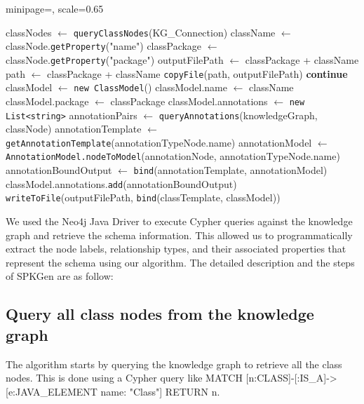 \documentclass[runningheads]{llncs}
\begin{document}
\begin{algorithm}
\caption{SPKGen Algorithm}
\begin{adjustbox}{minipage=\textwidth, scale=0.65}
\begin{algorithmic}[1]
    \State classNodes $\gets$ \texttt{queryClassNodes}(KG\_Connection)
        \State className $\gets$ classNode.\texttt{getProperty}("name")
        \State classPackage $\gets$ classNode.\texttt{getProperty}("package")
        \State outputFilePath $\gets$ classPackage + className
        \State path $\gets$ classPackage + className
            \State \texttt{copyFile}(path, outputFilePath)
        \Else
            \State \textbf{continue}
        \EndIf
        \State classModel $\gets$ \texttt{new ClassModel}()
        \State classModel.name $\gets$ className
        \State classModel.package $\gets$ classPackage
        \State classModel.annotations $\gets$ \texttt{new List<string>}
        \State annotationPairs $\gets$ \texttt{queryAnnotations}(knowledgeGraph, classNode)
            \State annotationTemplate $\gets$ \texttt{getAnnotationTemplate}(annotationTypeNode.name)
            \State annotationModel $\gets$ \texttt{AnnotationModel.nodeToModel}(annotationNode, annotationTypeNode.name)
            \State annotationBoundOutput $\gets$ \texttt{bind}(annotationTemplate, annotationModel)
            \State classModel.annotations.\texttt{add}(annotationBoundOutput)
            \State \texttt{writeToFile}(outputFilePath, \texttt{bind}(classTemplate, classModel))
        \EndFor
    \EndFor
\EndFunction
\end{algorithmic}
\end{adjustbox}
\end{algorithm}

We used the Neo4j Java Driver to execute Cypher queries against the knowledge graph and retrieve the schema information. This allowed us to programmatically extract the node labels, relationship types, and their associated properties that represent the schema using our algorithm. The detailed description and the steps of SPKGen are as follow:

\subsection{Query all class nodes from the knowledge graph}
The algorithm starts by querying the knowledge graph to retrieve all the class nodes. This is done using a Cypher query like MATCH [n:CLASS]-[:IS\_A]->[e:JAVA\_ELEMENT {name: "Class"}] RETURN n.
\end{document}
